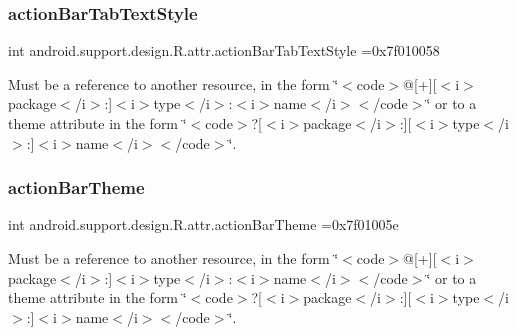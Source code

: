 \subsubsection{\texorpdfstring{action\+Bar\+Tab\+Text\+Style}{actionBarTabTextStyle}}
{\footnotesize\ttfamily int android.\+support.\+design.\+R.\+attr.\+action\+Bar\+Tab\+Text\+Style =0x7f010058\hspace{0.3cm}{\ttfamily [static]}}

Must be a reference to another resource, in the form \char`\"{}$<$code$>$@\mbox{[}+\mbox{]}\mbox{[}$<$i$>$package$<$/i$>$\+:\mbox{]}$<$i$>$type$<$/i$>$\+:$<$i$>$name$<$/i$>$$<$/code$>$\char`\"{} or to a theme attribute in the form \char`\"{}$<$code$>$?\mbox{[}$<$i$>$package$<$/i$>$\+:\mbox{]}\mbox{[}$<$i$>$type$<$/i$>$\+:\mbox{]}$<$i$>$name$<$/i$>$$<$/code$>$\char`\"{}. \mbox{\label{classandroid_1_1support_1_1design_1_1R_1_1attr_aa73a7a3e8185f77a2a9cfffdaeb18049}} 
\subsubsection{\texorpdfstring{action\+Bar\+Theme}{actionBarTheme}}
{\footnotesize\ttfamily int android.\+support.\+design.\+R.\+attr.\+action\+Bar\+Theme =0x7f01005e\hspace{0.3cm}{\ttfamily [static]}}

Must be a reference to another resource, in the form \char`\"{}$<$code$>$@\mbox{[}+\mbox{]}\mbox{[}$<$i$>$package$<$/i$>$\+:\mbox{]}$<$i$>$type$<$/i$>$\+:$<$i$>$name$<$/i$>$$<$/code$>$\char`\"{} or to a theme attribute in the form \char`\"{}$<$code$>$?\mbox{[}$<$i$>$package$<$/i$>$\+:\mbox{]}\mbox{[}$<$i$>$type$<$/i$>$\+:\mbox{]}$<$i$>$name$<$/i$>$$<$/code$>$\char`\"{}. \mbox{\label{classandroid_1_1support_1_1design_1_1R_1_1attr_a6cb38d746e53af08824c992a2ee02166}} 
